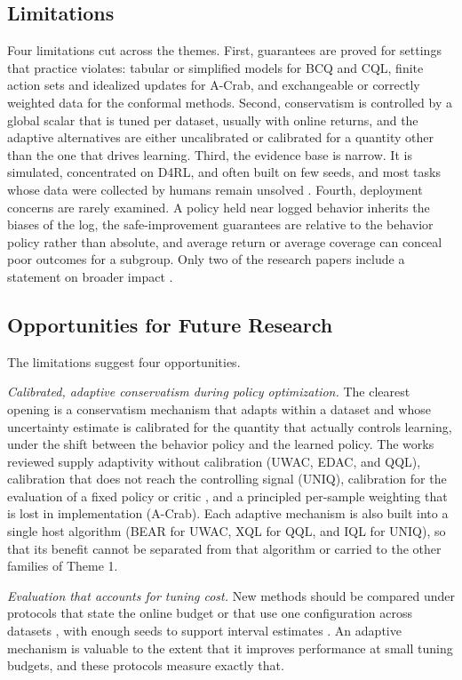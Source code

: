 \documentclass[conference]{IEEEtran}
\begin{document}
\subsection{Limitations}
Four limitations cut across the themes. First, guarantees are proved for settings that practice violates: tabular or simplified models for BCQ and CQL, finite action sets and idealized updates for A-Crab, and exchangeable or correctly weighted data for the conformal methods. Second, conservatism is controlled by a global scalar that is tuned per dataset, usually with online returns, and the adaptive alternatives are either uncalibrated or calibrated for a quantity other than the one that drives learning. Third, the evidence base is narrow. It is simulated, concentrated on D4RL, and often built on few seeds, and most tasks whose data were collected by humans remain unsolved \cite{tarasov2023rebrac}. Fourth, deployment concerns are rarely examined. A policy held near logged behavior inherits the biases of the log, the safe-improvement guarantees are relative to the behavior policy rather than absolute, and average return or average coverage can conceal poor outcomes for a subgroup. Only two of the research papers include a statement on broader impact \cite{fujimoto2021td3bc,snell2025bqcp}.

\subsection{Opportunities for Future Research}
The limitations suggest four opportunities.

\emph{Calibrated, adaptive conservatism during policy optimization.} The clearest opening is a conservatism mechanism that adapts within a dataset and whose uncertainty estimate is calibrated for the quantity that actually controls learning, under the shift between the behavior policy and the learned policy. The works reviewed supply adaptivity without calibration (UWAC, EDAC, and QQL), calibration that does not reach the controlling signal (UNIQ), calibration for the evaluation of a fixed policy or critic \cite{gan2025conformal,vanderlaan2026bellman}, and a principled per-sample weighting that is lost in implementation (A-Crab). Each adaptive mechanism is also built into a single host algorithm (BEAR for UWAC, XQL for QQL, and IQL for UNIQ), so that its benefit cannot be separated from that algorithm or carried to the other families of Theme 1.

\emph{Evaluation that accounts for tuning cost.} New methods should be compared under protocols that state the online budget \cite{kurenkov2022budget,jackson2025unifloral} or that use one configuration across datasets \cite{gao2026qql}, with enough seeds to support interval estimates \cite{agarwal2021precipice}. An adaptive mechanism is valuable to the extent that it improves performance at small tuning budgets, and these protocols measure exactly that.
\end{document}
